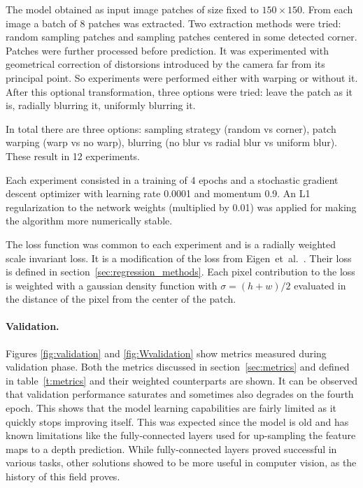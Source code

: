 The model obtained as input image patches of size fixed to $150 \times 150$.
From each image a batch of 8 patches was extracted.
Two extraction methods were tried: random sampling patches and sampling patches centered in some detected corner.
Patches were further processed before prediction.
It was experimented with geometrical correction of distorsions introduced by the camera far from its principal point.
So experiments were performed either with warping or without it.
After this optional transformation, three options were tried: leave the patch as it is, radially blurring it, uniformly blurring it.

In total there are three options: sampling strategy (random vs corner), patch warping (warp vs no warp), blurring (no blur vs radial blur vs uniform blur).
These result in 12 experiments.

Each experiment consisted in a training of 4 epochs and a stochastic gradient descent optimizer with learning rate 0.0001 and momentum 0.9.
An L1 regularization to the network weights (multiplied by 0.01) was applied for making the algorithm more numerically stable.

The loss function was common to each experiment and is a radially weighted scale invariant loss.
It is a modification of the loss from Eigen~et~al.~\cite{Eigen}.
Their loss is defined in section~\ref{sec:regression_methods}.
Each pixel contribution to the loss is weighted with a gaussian density function with $\sigma = (h + w) / 2$ evaluated in the distance of the pixel from the center of the patch.

\paragraph{Validation.}
Figures \ref{fig:validation} and \ref{fig:Wvalidation} show metrics measured during validation phase.
Both the metrics discussed in section~\ref{sec:metrics} and defined in table~\ref{t:metrics} and their weighted counterparts are shown.
It can be observed that validation performance saturates and sometimes also degrades on the fourth epoch.
This shows that the model learning capabilities are fairly limited as it quickly stops improving itself.
This was expected since the model is old and has known limitations like the fully-connected layers used for up-sampling the feature maps to a depth prediction.
While fully-connected layers proved successful in various tasks, other solutions showed to be more useful in computer vision, as the history of this field proves.

